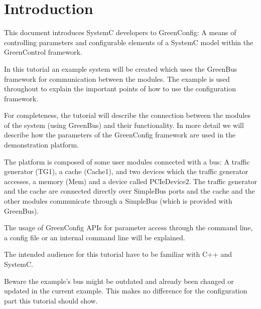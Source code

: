 
\section{Introduction}

This document introduces SystemC developers to GreenConfig: A means of
controlling parameters and configurable elements of a SystemC model
within the GreenControl framework.

In this tutorial an example system will be created which uses the GreenBus framework for
communication between the modules.  The example is used throughout to explain the important points of
how to use the configuration framework.

For completeness, the tutorial will describe the connection between the modules of the system (using
GreenBus) and their functionality. In more detail we will describe how the parameters of
the GreenConfig framework are used in the demonstration platform.

The platform is composed of some user modules connected with a bus: A traffic generator (TG1), a
cache (Cache1), and two devices which the traffic generator accesses, a memory (Mem) and a device
called PCIeDevice2. The traffic generator and the cache are connected directly over SimpleBus ports
and the cache and the other modules communicate through a SimpleBus (which is provided with GreenBus).

The usage of GreenConfig APIs for parameter access through the command line, a config file or an internal command line will be explained.

The intended audience for this tutorial have to be familiar with C++ and SystemC.

 Beware the example's bus might be outdated and already been changed or updated in the current example. This makes no difference for the configuration part this tutorial should show.

